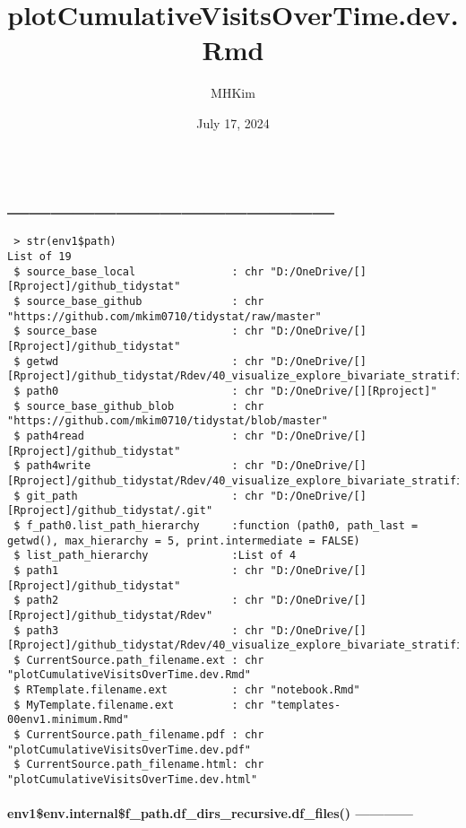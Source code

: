 \documentclass[
]{article}
\title{plotCumulativeVisitsOverTime.dev.Rmd}
\author{MHKim}
\date{July 17, 2024}
\begin{document}
\maketitle

{
\setcounter{tocdepth}{6}
\tableofcontents
}
\hypertarget{section}{%
\section{\_\_\_\_\_\_\_\_\_\_\_\_\_\_\_}\label{section}}

\begin{verbatim}
 > str(env1$path)
List of 19
 $ source_base_local               : chr "D:/OneDrive/[][Rproject]/github_tidystat"
 $ source_base_github              : chr "https://github.com/mkim0710/tidystat/raw/master"
 $ source_base                     : chr "D:/OneDrive/[][Rproject]/github_tidystat"
 $ getwd                           : chr "D:/OneDrive/[][Rproject]/github_tidystat/Rdev/40_visualize_explore_bivariate_stratified/49_time"
 $ path0                           : chr "D:/OneDrive/[][Rproject]"
 $ source_base_github_blob         : chr "https://github.com/mkim0710/tidystat/blob/master"
 $ path4read                       : chr "D:/OneDrive/[][Rproject]/github_tidystat"
 $ path4write                      : chr "D:/OneDrive/[][Rproject]/github_tidystat/Rdev/40_visualize_explore_bivariate_stratified/49_time"
 $ git_path                        : chr "D:/OneDrive/[][Rproject]/github_tidystat/.git"
 $ f_path0.list_path_hierarchy     :function (path0, path_last = getwd(), max_hierarchy = 5, print.intermediate = FALSE)  
 $ list_path_hierarchy             :List of 4
 $ path1                           : chr "D:/OneDrive/[][Rproject]/github_tidystat"
 $ path2                           : chr "D:/OneDrive/[][Rproject]/github_tidystat/Rdev"
 $ path3                           : chr "D:/OneDrive/[][Rproject]/github_tidystat/Rdev/40_visualize_explore_bivariate_stratified"
 $ CurrentSource.path_filename.ext : chr "plotCumulativeVisitsOverTime.dev.Rmd"
 $ RTemplate.filename.ext          : chr "notebook.Rmd"
 $ MyTemplate.filename.ext         : chr "templates-00env1.minimum.Rmd"
 $ CurrentSource.path_filename.pdf : chr "plotCumulativeVisitsOverTime.dev.pdf"
 $ CurrentSource.path_filename.html: chr "plotCumulativeVisitsOverTime.dev.html"
\end{verbatim}

\hypertarget{env1env.internalf_path.df_dirs_recursive.df_files}{%
\paragraph{env1\$env.internal\$f\_path.df\_dirs\_recursive.df\_files()
------------}\label{env1env.internalf_path.df_dirs_recursive.df_files}}
\end{document}
